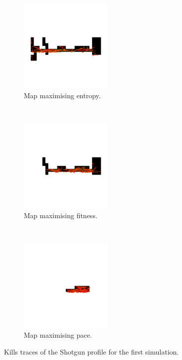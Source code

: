 \begin{figure}[H]
    \centering
    \begin{subfigure}[t]{0.3\textwidth}
        \centering
        \includegraphics[height=4.5cm]{Images/images/experiment_one/best_entropy_pop_0/kill_traces_bot_0.png}
        \caption{Map maximising entropy.}
    \end{subfigure}%
    ~ 
    \begin{subfigure}[t]{0.3\textwidth}
        \centering
        \includegraphics[height=4.5cm]{Images/images/experiment_one/best_fitness_pop_0/kill_traces_bot_0.png}
        \caption{Map maximising fitness.}
    \end{subfigure}
    ~ 
    \begin{subfigure}[t]{0.3\textwidth}
        \centering
        \includegraphics[height=4.5cm]{Images/images/experiment_one/best_pace_pop_0/kill_traces_bot_0.png}
        \caption{Map maximising pace.}
    \end{subfigure}
    \caption{Kills traces of the Shotgun profile for the first simulation.}
\end{figure}

\newpage


